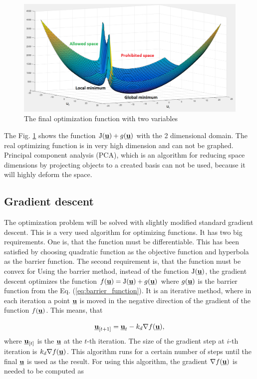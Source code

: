 \documentclass[a4paper,11pt,titlepage]{article}
\newcommand{\uvec}{\textbf{\underline{u}}}
\newcommand{\macJ}{\mathrm{J}(\uvec)}
\newcommand{\macf}{f(\uvec)}
\newcommand{\macg}{g(\uvec)}
\begin{document}
\begin{figure}[h]
\centering
\includegraphics[width=1\textwidth]{fig/LQCP2D.png}
\caption{The final optimization function with two variables}
\label{fig:barrier_function_3D}
\end{figure}

The Fig. \ref{fig:barrier_function_3D} shows the function $\macJ + \macg$ with the 2 dimensional domain. The real optimizing function is in very high dimension and can not be graphed. Principal component analysis (PCA), which is an algorithm for reducing space dimensions by projecting objects to a created basis can not be used, because it will highly deform the space.

\subsection{Gradient descent}
The optimization problem will be solved with slightly modified standard gradient descent. This is a very used algorithm for optimizing functions. It has two big requirements. One is, that the function must be differentiable. This has been satisfied by choosing quadratic function as the objective function and hyperbola as the barrier function. The second requirement is, that the function must be convex for Using the barrier method, instead of the function $\macJ$, the gradient descent optimizes the function $\macf = \macJ + \macg$ where $\macg$ is the barrier function from the Eq. (\ref{eq:barrier_function}). 
It is an iterative method, where in each iteration a point $\uvec$ is moved in the negative direction of the gradient of the function $f(\uvec)$. This means, that 

\begin{equation}
\label{eq:gradient_descend}
\uvec_{[t+1]} = \uvec_{t} - k_d \nabla \macf,
\end{equation}
where $\uvec_{[t]}$ is the $\uvec$ at the $t$-th iteration. The size of the gradient step at $i$-th iteration is $k_d \nabla \macf$.  This algorithm runs for a certain number of steps until the final $\uvec$ is used as the result. For using this algorithm, the gradient $\nabla \macf$ is needed to be computed as
\end{document}
